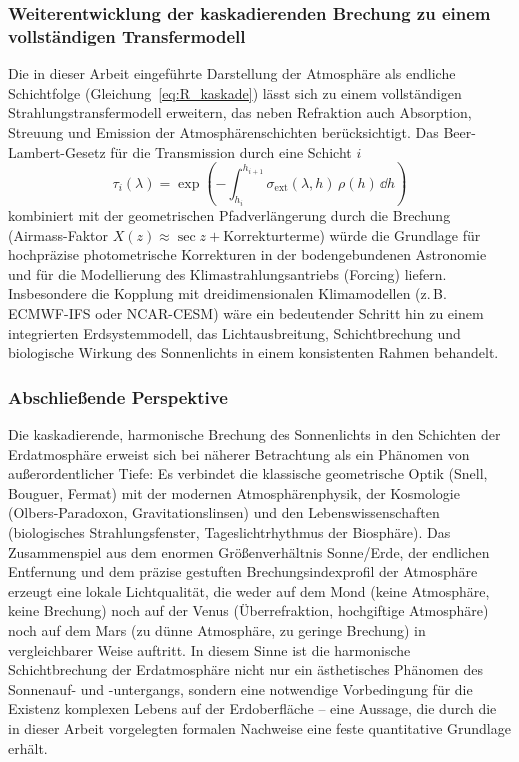 ﻿\documentclass[12pt,a4paper]{article}
\begin{document}
\subsubsection{Weiterentwicklung der kaskadierenden Brechung
               zu einem vollständigen Transfermodell}

Die in dieser Arbeit eingeführte Darstellung der Atmosphäre als
endliche Schichtfolge (Gleichung~\ref{eq:R_kaskade}) lässt sich
zu einem vollständigen Strahlungs\-transfermodell erweitern,
das neben Refraktion auch Absorption, Streuung und Emission
der Atmosphärenschichten berücksichtigt.
Das Beer-Lambert-Gesetz für die Transmission durch eine Schicht $i$
\begin{equation}
  \tau_i(\lambda) = \exp\!\left(-\int_{h_i}^{h_{i+1}}
    \sigma_{\mathrm{ext}}(\lambda,h)\,\rho(h)\,\dd h \right)
  \label{eq:beer_lambert}
\end{equation}
kombiniert mit der geometrischen Pfadverlängerung durch die Brechung
(Airmass-Faktor $X(z) \approx \sec z + \text{Korrekturterme}$)
würde die Grundlage für hochpräzise photometrische Korrekturen
in der bodengebundenen Astronomie und für die Modellierung des
Klimastrahlungsantriebs (Forcing) liefern.
Insbesondere die Kopplung mit dreidimensionalen Klimamodellen
(z.\,B. ECMWF-IFS oder NCAR-CESM) wäre ein bedeutender Schritt
hin zu einem integrierten Erd\-system\-modell,
das Lichtausbreitung, Schichtbrechung und biologische
Wirkung des Sonnenlichts in einem konsistenten Rahmen behandelt.

\subsubsection{Abschließende Perspektive}

Die kaskadierende, harmonische Brechung des Sonnenlichts in den
Schichten der Erdatmosphäre erweist sich bei näherer Betrachtung
als ein Phänomen von außerordentlicher Tiefe:
Es verbindet die klassische geometrische Optik (Snell, Bouguer, Fermat)
mit der modernen Atmosphärenphysik, der Kosmologie (Olbers-Paradoxon,
Gravitationslinsen) und den Lebenswissenschaften (biologisches
Strahlungsfenster, Tageslichtrhythmus der Biosphäre).
Das Zusammenspiel aus dem enormen Größenverhältnis Sonne/Erde,
der endlichen Entfernung und dem präzise gestuften Brechungsindexprofil
der Atmosphäre erzeugt eine lokale Lichtqualität,
die weder auf dem Mond (keine Atmosphäre, keine Brechung)
noch auf der Venus (Überrefraktion, hochgiftige Atmosphäre)
noch auf dem Mars (zu dünne Atmosphäre, zu geringe Brechung)
in vergleichbarer Weise auftritt.
In diesem Sinne ist die harmonische Schichtbrechung der Erdatmosphäre
nicht nur ein ästhetisches Phänomen des Sonnenauf- und -untergangs,
sondern eine notwendige Vorbedingung für die Existenz komplexen
Lebens auf der Erdoberfläche --
eine Aussage, die durch die in dieser Arbeit vorgelegten formalen
Nachweise eine feste quantitative Grundlage erhält.
\end{document}
